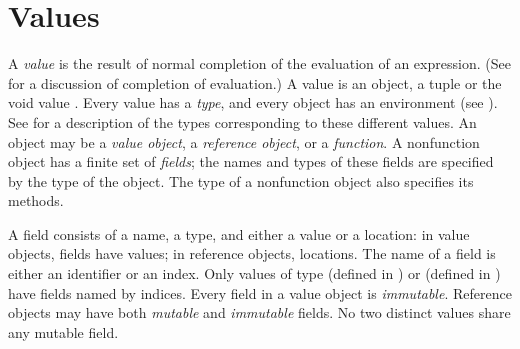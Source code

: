 %
%
%
%

\section{Values}




A \emph{value} is the result of normal completion of the evaluation of
an expression.
(See  for a discussion of completion of evaluation.)
A value is an object, a tuple or the void value \EXP{()}.
Every value has a \emph{type},
and every object has an environment (see ).
See  for a description of the types
corresponding to these different values.
An object may be a \emph{value object},
a \emph{reference object},
or a \emph{function}.
A nonfunction object has a finite set of \emph{fields};
the names and types of these fields are specified by the type of the object.
The type of a nonfunction object also specifies its methods.

A field consists of a name, a type, and either a value or a location:
in value objects, fields have values;
in reference objects, locations.
The name of a field is either an identifier or an index.
Only values of type 
(defined in ) or 
(defined in ) have fields named by indices.
Every field in a value object is \emph{immutable}.
Reference objects may have both \emph{mutable} and \emph{immutable} fields.
No two distinct values share any mutable field.


